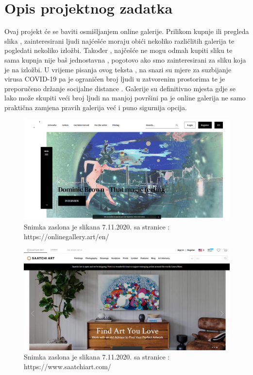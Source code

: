\chapter{Opis projektnog zadatka}
		
		{Ovaj projekt će se baviti osmišljanjem online galerije. Prilikom kupnje ili pregleda slika , zainteresirani ljudi najćešće moraju obići nekoliko različlitih galerija te pogledati nekoliko  izložbi. 		Također , najčešće ne mogu odmah kupiti sliku te sama kupnja nije baš jednostavna , pogotovo ako smo zainteresirani za sliku koja je na izložbi. 
			 U vrijeme pisanja ovog  teksta , na snazi su mjere za suzbijanje virusa COVID-19 pa je ograničen broj ljudi u zatvorenim prostorima te je preporučeno držanje socijalne distance . Galerije su definitivno  mjesta gdje se lako može skupiti  veći broj ljudi na manjoj površini pa je online galerija ne samo praktična zamjena pravih galerija  već i puno sigurnija opcija. 	
		\vspace{10mm} 
}
		\graphicspath{ {./slike/} }
				\begin{figure}[H]

					\includegraphics[width=\textwidth,height=\textheight,keepaspectratio]{onlinegallery_art}
					\caption{\newline Snimka zaslona je slikana 7.11.2020. sa  stranice : https://onlinegallery.art/en/ }

				\end{figure}
		\graphicspath{ {./slike/} }
				\begin{figure}[H]

					\includegraphics[width=\textwidth,height=\textheight,keepaspectratio]{saatchiart_com}
					\caption{\newline Snimka zaslona je slikana 7.11.2020. sa  stranice : https://www.saatchiart.com/}

				\end{figure}	
		
